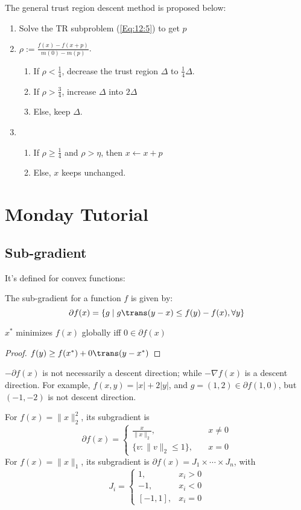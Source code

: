 The general trust region descent method is proposed below:
\begin{enumerate}
\item
Solve the TR subproblem (\ref{Eq:12:5}) to get $p$
\item
$\rho:=\frac{f(x) - f(x+p)}{m(0) - m(p)}$. 
\begin{enumerate}
\item
If $\rho<\frac{1}{4}$, decrease the trust region $\Delta$ to $\frac{1}{4}\Delta$.
\item
If $\rho>\frac{3}{4}$, increase $\Delta$ into $2\Delta$
\item
Else, keep $\Delta$.
\end{enumerate}
\item
\begin{enumerate}
\item
If $\rho\ge\frac{1}{4}$ and $\rho>\eta$, then $x\leftarrow x+p$
\item
Else, $x$ keeps unchanged.
\end{enumerate}
\end{enumerate}




\section{Monday Tutorial}
\subsection{Sub-gradient}
It's defined for convex functions:
\begin{definition}
The sub-gradient for a function $f$ is given by:
\[
\partial f(x)=\{g\mid g\trans (y-x)\le f(y) - f(x),\forall y\}
\]
\end{definition}
\begin{proposition}
$x^*$ minimizes $f(x)$ globally iff $0\in\partial f(x)$
\end{proposition}
\begin{proof}
$
f(y)\ge f(x^*)+0\trans(y-x^*)
$
\end{proof}
\begin{remark}
$-\partial f(x)$ is not necessarily a descent direction; while $-\nabla f(x)$ is a descent direction. For example, $f(x,y)=|x|+2|y|$, and $g=(1,2)\in\partial f(1,0)$, but $(-1,-2)$ is not descent direction.
\end{remark}

\begin{example}
For $f(x) = \|x\|_2^2$, its subgradient is
\[
\partial f(x)=\left\{
\begin{aligned}
\frac{x}{\|x\|_2},&\quad x\ne0\\
\{v:\|v\|_2\le 1\},&\quad x=0
\end{aligned}
\right.
\]
For $f(x)=\|x\|_1$, its subgradient is $\partial f(x)=J_1\times\cdots\times J_n$, with
\[
J_i=\left\{
\begin{aligned}
1,&x_i>0\\
-1,&x_i<0\\
[-1,1],&x_i=0
\end{aligned}
\right.
\]
\end{example}
